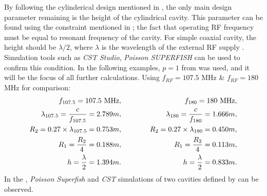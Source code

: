 \documentclass[a4paper,oneside,12pt]{report}
\numberwithin{equation}{chapter}
\begin{document}
By following the cylinderical design mentioned in , the only main design parameter remaining is the height of the cylindrical cavity.
This parameter can be found using the constraint mentioned in ; the fact that operating RF frequency must be equal to resonant frequency of the cavity.
For simple coaxial cavity, the height should be $\lambda/2$, where $\lambda$ is the wavelength of the external RF supply \cite{rhodo_pottier}.
Simulation tools such as \textit{CST Studio}, \textit{Poisson SUPERFISH} can be used to confirm this condition.
\clearpage
In the following examples, $p=1$ from  was used, and it will be the focus of all further calculations.
Using $f_{RF}=107.5$ MHz \& $f_{RF}=180$ MHz for comparison:
\vspace{-20pt}\begin{eqnarray} \label{eq:107_180_MHZ_cavity_design_parameters}
    \begin{aligned}
        f_{107.5} = 107.5 \textrm{ MHz}  , \\
        \lambda_{107.5}  = \frac{c}{f_{107.5}} = 2.789 m   ,\\
        R_2 = 0.27 \times \lambda_{107.5} = 0.753 m   ,\\
        R_1 = \frac{R_2}{4} = 0.188 m   ,\\
        h = \frac{\lambda}{2} = 1.394 m .
    \end{aligned}
    \qquad\qquad
    \begin{aligned}
        f_{180} = 180 \textrm{ MHz}   ,\\
        \lambda_{180}  = \frac{c}{f_{180}} = 1.666 m  , \\
        R_2 = 0.27 \times\lambda_{180} = 0.450 m  , \\
        R_1 = \frac{R_2}{4} = 0.113 m  , \\
        h = \frac{\lambda}{2} = 0.833 m . 
    \end{aligned}
\vspace{-10pt}\end{eqnarray}
In the , 
\textit{Poisson Superfish} and \textit{CST} simulations of two cavities defined by  can be observed.
\iffalse
\end{document}
